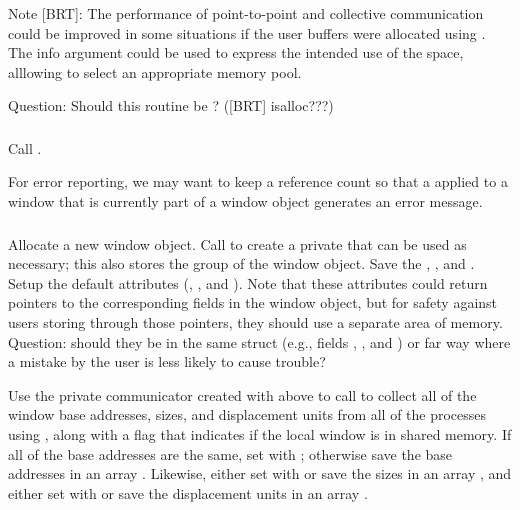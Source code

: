 \documentclass{article}
\begin{document}
Note [BRT]: The performance of point-to-point and collective communication
could be improved in some situations if the user buffers were
allocated using .  The info argument could be
used to express the intended use of the space, alllowing
 to select an appropriate memory pool.

Question: Should this routine be ?  ([BRT] isalloc???)

\subsubsection{}
Call .

For error reporting, we may want to keep a reference count so that a
 applied to a window that is currently part of a window
object generates an error message.

\subsubsection{}
Allocate a new window object.  Call  to create a
private  that can be used as necessary; this also stores
the group of the window object.  Save the ,
, and . 
Setup the default attributes (,
, and ).  Note that these
attributes could return pointers to the corresponding fields in the window
object, but for safety against users storing through those pointers, they
should use a separate area of memory.  Question: should they be in the same
struct (e.g., fields , ,
and ) or far way where a mistake by the user is
less likely to cause trouble?

Use the private communicator created with  above to
call  to
collect all of the window base addresses, sizes, and displacement
units from all of the processes using , along
with a flag that indicates if the local window is in shared memory.
If all of the base addresses are the same, set 
with ; otherwise save the base
addresses in an array .  Likewise, either set
 with  or save
the sizes in an array , and either set
 with  or save
the displacement units in an array .
\end{document}

